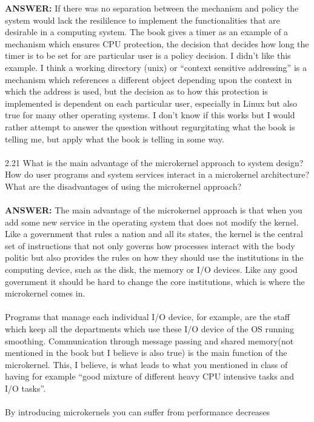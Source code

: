 \documentclass[12pt]{article}
\begin{document}
\textbf{ANSWER: }If there was no separation between the mechanism 
and policy the system would lack the resililence to implement the 
functionalities that are desirable in a computing system. The book 
gives a timer as an example of a mechanism which ensures CPU 
protection, the decision that decides how long the timer is 
to be set for are particular user is a policy decision. I didn't 
like this example. I think a working directory (unix) or ``context 
sensitive addressing'' is a mechanism which references a 
different object depending upon the context in which the 
address is used, but the decision as to how this protection 
is implemented is dependent on each particular user, especially in 
Linux but also true for many other operating systems. I don't know 
if this works but I would rather attempt to answer the question without 
regurgitating what the book is telling me, but apply what the 
book is telling in some way.
\\\\2.21 What is the main advantage of the microkernel approach to system
design? How do user programs and system services interact in a
microkernel architecture? What are the disadvantages of using the
microkernel approach?\\\\
\textbf{ANSWER: }The main advantage of the microkernel approach 
is that when you add some new service in the operating system that 
does not modify the kernel. Like a government that rules a nation 
and all its states, the kernel is the central set of instructions 
that not only governs how processes interact with the body politic 
but also provides the rules on how they should use the institutions 
in the computing device, such as the disk, the memory or I/O devices.
Like any good government it should be hard to change the core 
institutions, which is where the microkernel comes in.\\\\
Programs that manage each individual I/O device, for example, 
are the staff which keep all the departments which use these I/O 
device of the OS running smoothing. Communication through message 
passing and shared memory(not mentioned in the book but I believe 
is also true) is the main function of the microkernel. This, I believe, 
is what leads to what you mentioned in class of having for example
 ``good mixture of different heavy CPU intensive tasks 
and I/O tasks''.\\\\
By introducing microkernels you can suffer from performance decreases 
\end{document}
